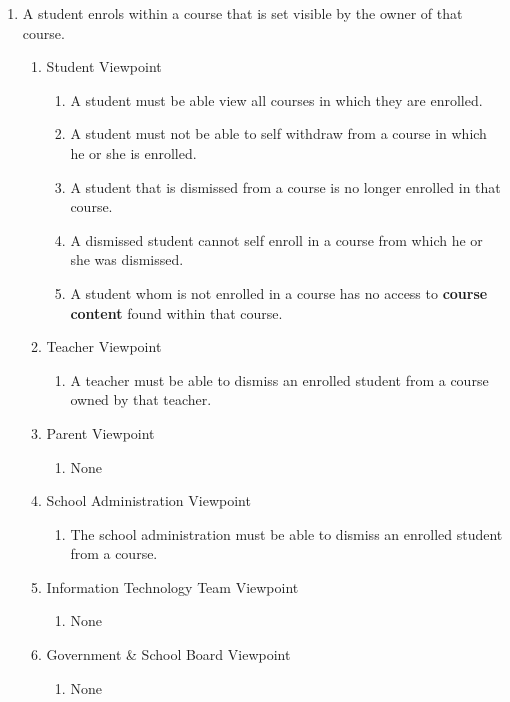 \documentclass[]{article}
\begin{document}
\begin{enumerate}[{BE}1.]
	\item A student enrols within a course that is set visible by the owner of that
course.
	\begin{enumerate}[{VP2}.1]
		\item Student Viewpoint
			\begin{enumerate}
				\item A student must be able view all courses in which they are enrolled.
				\item A student must not be able to self withdraw from a course in which he
or she is enrolled.
				\item A student that is dismissed from a course is no longer enrolled in
that course.
				\item A dismissed student cannot self enroll in a course from which he or
she was dismissed.
				\item A student whom is not enrolled in a course has no access to
\textbf{course content} found within that course.
			\end{enumerate}
		\item Teacher Viewpoint
			\begin{enumerate}
				\item A teacher must be able to dismiss an enrolled student from a course
owned by that teacher.
			\end{enumerate}
		\item Parent Viewpoint
			\begin{enumerate}
				\item None
			\end{enumerate}
		\item School Administration Viewpoint
			\begin{enumerate}
				\item The school administration must be able to dismiss an enrolled student
from a course.
			\end{enumerate}
		\item Information Technology Team Viewpoint
			\begin{enumerate}
				\item None
			\end{enumerate}
		\item Government \& School Board Viewpoint
			\begin{enumerate}
				\item None
			\end{enumerate}
	\end{enumerate}


\end{enumerate}
\end{document}
